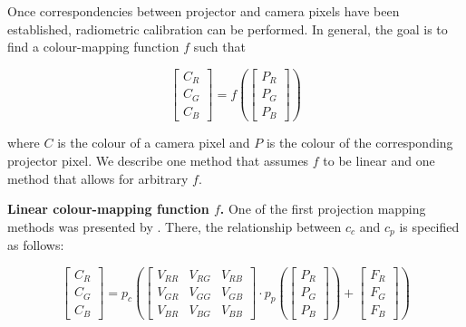 Once correspondencies between projector and camera pixels have been established, radiometric calibration can be performed. In general, the goal is to find a colour-mapping function \(f\) such that

\begin{equation}
    \label{eq:radiometric_calibration}
    \begin{bmatrix}
        C_R \\
        C_G \\
        C_B
    \end{bmatrix} = f(
        \begin{bmatrix}
            P_R \\
            P_G \\
            P_B
        \end{bmatrix}
    )
\end{equation}

where \(C\) is the colour of a camera pixel and \(P\) is the colour of the corresponding projector pixel. We describe one method that assumes \(f\) to be linear and one method that allows for arbitrary \(f\).

\textbf{Linear colour-mapping function \(f\).} One of the first projection mapping methods was presented by \citet{Grossberg2004}. There, the relationship between \(c_c\) and \(c_p\) is specified as follows:

\begin{equation}
    \label{eq:linear_colour_mapping}
    \begin{bmatrix}
        C_R \\
        C_G \\
        C_B
    \end{bmatrix} = p_c(
        \begin{bmatrix}
            V_{RR} & V_{RG} & V_{RB} \\
            V_{GR} & V_{GG} & V_{GB} \\
            V_{BR} & V_{BG} & V_{BB}
        \end{bmatrix} \cdot p_p(
            \begin{bmatrix}
                P_R \\
                P_G \\
                P_B
            \end{bmatrix}
        ) +
        \begin{bmatrix}
            F_R \\
            F_G \\
            F_B
        \end{bmatrix}
    )
\end{equation}

